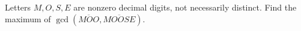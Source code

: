 Letters $M,O,S,E$ are nonzero decimal digits, not necessarily distinct. Find the maximum of $\gcd(\overline{MOO},\overline{MOOSE})$.
